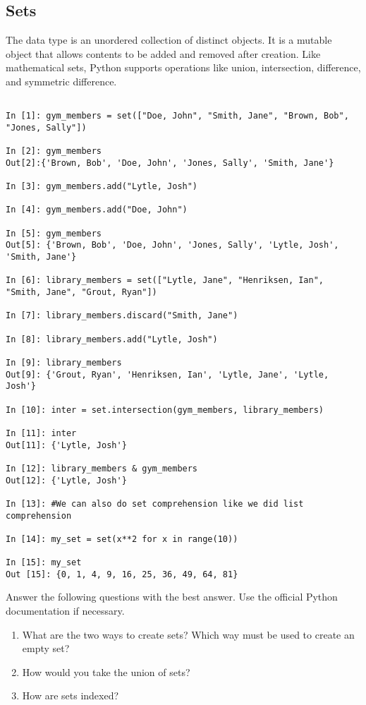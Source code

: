 \subsection*{Sets}
\begin{example}

The  data type is an unordered collection of distinct objects.
It is a mutable object that allows contents to be added and removed after creation. 
Like mathematical sets, Python supports operations like union, intersection, 
difference, and symmetric difference. 

\begin{lstlisting}

In [1]: gym_members = set(["Doe, John", "Smith, Jane", "Brown, Bob", "Jones, Sally"])

In [2]: gym_members
Out[2]:{'Brown, Bob', 'Doe, John', 'Jones, Sally', 'Smith, Jane'}

In [3]: gym_members.add("Lytle, Josh")

In [4]: gym_members.add("Doe, John")

In [5]: gym_members
Out[5]: {'Brown, Bob', 'Doe, John', 'Jones, Sally', 'Lytle, Josh', 'Smith, Jane'}

In [6]: library_members = set(["Lytle, Jane", "Henriksen, Ian", "Smith, Jane", "Grout, Ryan"])

In [7]: library_members.discard("Smith, Jane")

In [8]: library_members.add("Lytle, Josh") 

In [9]: library_members
Out[9]: {'Grout, Ryan', 'Henriksen, Ian', 'Lytle, Jane', 'Lytle, Josh'}

In [10]: inter = set.intersection(gym_members, library_members)

In [11]: inter
Out[11]: {'Lytle, Josh'}

In [12]: library_members & gym_members
Out[12]: {'Lytle, Josh'}

In [13]: #We can also do set comprehension like we did list comprehension

In [14]: my_set = set(x**2 for x in range(10))

In [15]: my_set
Out [15]: {0, 1, 4, 9, 16, 25, 36, 49, 64, 81}

\end{lstlisting}
\end{example}

\begin{problem}
Answer the following questions with the best answer. Use the official Python documentation if necessary.
\begin{enumerate}
\item What are the two ways to create sets? Which way must be used to 
create an empty set?
\item How would you take the union of sets?
\item How are sets indexed?

\end{enumerate}
\end{problem}

